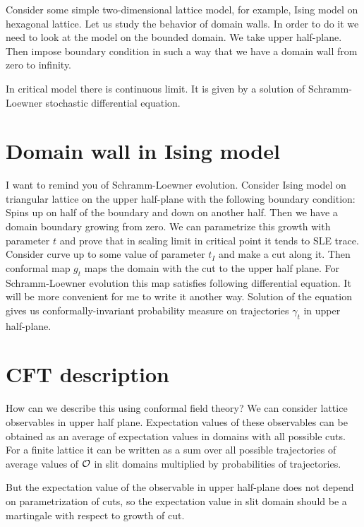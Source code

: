 \documentclass[a4paper]{article}
\begin{document}
Consider some simple two-dimensional lattice model, for example, Ising
model on hexagonal lattice. Let us study the behavior of domain walls.
In order to do it we need to look at the model on the bounded domain.
We take upper half-plane. Then impose boundary condition in such a way
that we have a domain wall from zero to infinity.

In critical model there is continuous limit. It is given by a solution
of Schramm-Loewner stochastic differential equation. 

\section{Domain wall in Ising model}
\label{sec:domain-wall-ising}

I want to remind you of Schramm-Loewner evolution. Consider Ising model on triangular lattice on the
upper half-plane  with the following boundary condition: Spins up on half of the boundary and down
on another half. Then we have a domain boundary growing from zero. We can parametrize this growth
with parameter $t$ and prove that in scaling limit in critical point it tends to SLE trace. 
Consider curve up to some value of parameter $t_{I}$ and make a cut along it. Then conformal map
$g_{t}$ maps the domain with the cut to the upper half plane. For Schramm-Loewner evolution this map
satisfies following differential equation. It will be more convenient for me to write it another
way. Solution of the equation gives us conformally-invariant probability measure on trajectories
$\gamma_{t}$ in upper half-plane. 

\section{CFT description}
\label{sec:cft-description}

How can we describe this using conformal field theory? We can consider lattice observables in upper
half plane. Expectation values of these observables can be obtained as an average of expectation
values in domains with all possible cuts. For a finite lattice it can be written as a sum over all
possible trajectories of average values of ${\cal O}$ in slit domains multiplied by probabilities of
trajectories. 

But the expectation value of the observable in upper half-plane does not depend on parametrization
of cuts, so the expectation value in slit domain should be a martingale with respect to growth of
cut. 
\end{document}
